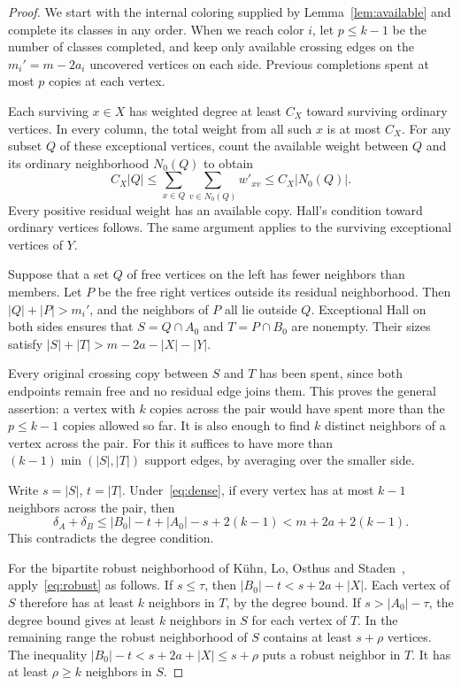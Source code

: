 \documentclass[11pt]{article}
\begin{document}
\begin{proof}
We start with the internal coloring supplied by Lemma~\ref{lem:available} and complete its classes in any order. When we reach color \(i\), let \(p\le k-1\) be the number of classes completed, and keep only available crossing edges on the \(m_i'=m-2a_i\) uncovered vertices on each side. Previous completions spent at most \(p\) copies at each vertex.

Each surviving \(x\in X\) has weighted degree at least \(C_X\) toward surviving ordinary vertices. In every column, the total weight from all such \(x\) is at most \(C_X\). For any subset \(Q\) of these exceptional vertices, count the available weight between \(Q\) and its ordinary neighborhood \(N_0(Q)\) to obtain
\[
   C_X|Q|\le \sum_{x\in Q}\sum_{v\in N_0(Q)}
             w'_{xv}\le C_X|N_0(Q)|.
\]
Every positive residual weight has an available copy. Hall's condition toward ordinary vertices follows. The same argument applies to the surviving exceptional vertices of \(Y\).

Suppose that a set \(Q\) of free vertices on the left has fewer neighbors than members. Let \(P\) be the free right vertices outside its residual neighborhood. Then \(|Q|+|P|>m_i'\), and the neighbors of \(P\) all lie outside \(Q\). Exceptional Hall on both sides ensures that \(S=Q\cap A_0\) and \(T=P\cap B_0\) are nonempty. Their sizes satisfy \(|S|+|T|>m-2a-|X|-|Y|\).

Every original crossing copy between \(S\) and \(T\) has been spent, since both endpoints remain free and no residual edge joins them. This proves the general assertion: a vertex with \(k\) copies across the pair would have spent more than the \(p\le k-1\) copies allowed so far. It is also enough to find \(k\) distinct neighbors of a vertex across the pair. For this it suffices to have more than \((k-1)\min(|S|,|T|)\) support edges, by averaging over the smaller side.

Write \(s=|S|\), \(t=|T|\). Under~\eqref{eq:dense}, if every vertex has at most \(k-1\) neighbors across the pair, then
\[
 \delta_A+\delta_B\le |B_0|-t+|A_0|-s+2(k-1)<m+2a+2(k-1).
\]
This contradicts the degree condition.

For the bipartite robust neighborhood of K\"uhn, Lo, Osthus and Staden~\cite{KLOS}, apply~\eqref{eq:robust} as follows. If \(s\le\tau\), then \(|B_0|-t<s+2a+|X|\). Each vertex of \(S\) therefore has at least \(k\) neighbors in \(T\), by the degree bound. If \(s>|A_0|-\tau\), the degree bound gives at least \(k\) neighbors in \(S\) for each vertex of \(T\). In the remaining range the robust neighborhood of \(S\) contains at least \(s+\rho\) vertices. The inequality \(|B_0|-t<s+2a+|X|\le s+\rho\) puts a robust neighbor in \(T\). It has at least \(\rho\ge k\) neighbors in \(S\).


\end{proof}
\end{document}

